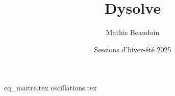 \documentclass{article}
\title{\textbf{Dysolve}}
\author{Mathis Beaudoin}
\date{Sessions d'hiver-été 2025}
\numberwithin{equation}{section}
\begin{document}

\maketitle
\clearpage

\tableofcontents
\clearpage


\newpage
{}
\setcounter{page}{1}

{eq_maitre.tex}
{oscillations.tex}

\newpage
 
 
\end{document}
